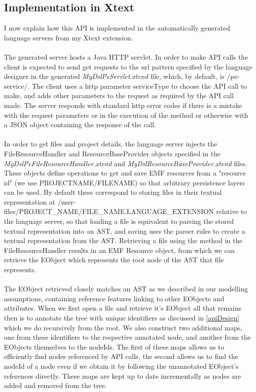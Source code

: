 \documentclass{article}
\begin{document}
\subsection{Implementation in Xtext}
I now explain how this API is implemented in the automatically generated language servers from my Xtext extension.
\\
\\
The generated server hosts a Java HTTP servlet. In order to make API calls the client is expected to send get requests to the url pattern specified by the language designer in the generated \emph{MyDslPeServlet.xtend} file, which, by default, is /pe-service/. The client uses a http parameter serviceType to choose the API call to make, and adds other parameters to the request as required by the API call made. The server responds with standard http error codes if there is a mistake with the request parameters or in the execution of the method or otherwise with a JSON object containing the response of the call.
\\
\\
In order to get files and project details, the language server injects the FileResourceHandler and ResourceBaseProvider objects specified in the \emph{MyDslPeFileResourceHandler.xtend} and \emph{MyDslResourceBaseProvider.xtend} files. These objects define operations to get and save EMF resources from a "resource id" (we use PROJECTNAME/FILENAME) so that arbitrary persistence layers can be used. By default these correspond to storing files in their textual representation at /user-files/PROJECT_NAME/FILE_NAME.LANGUAGE_EXTENSION relative to the language server, so that loading a file is equivalent to parsing the stored textual representation into an AST, and saving uses the parser rules to create a textual representation from the AST. Retrieving a file using the method in the FileResourceHandler results in an EMF Resource object, from which we can retrieve the EObject which represents the root node of the AST that file represents.
\\
\\
The EObject retrieved closely matches an AST as we described in our modelling assumptions, containing reference features linking to other EObjects and attributes. When we first open a file and retrieve it's EObject all that remains then is to annotate the tree with unique identifiers as discussed in \ref{apiDesign} which we do recursively from the root. We also construct two additional maps, one from these identifiers to the respective annotated node, and another from the EObjects themselves to the nodeIds. The first of these maps allows us to efficiently find nodes referenced by API calls, the second allows us to find the nodeId of a node even if we obtain it by following the unannotated EObject's references directly. These maps are kept up to date incrementally as nodes are added and removed from the tree.
\end{document}
